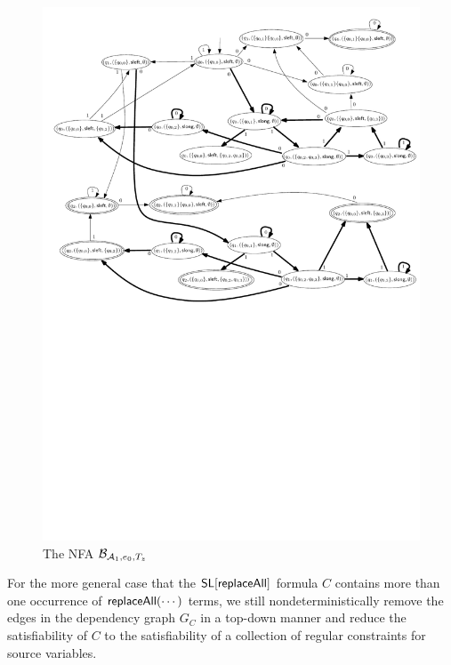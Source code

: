 \begin{example}
\begin{figure}[htbp]
\begin{center}
\includegraphics[scale=0.68]{regular-expression-example-2.pdf}
\end{center}
\caption{The NFA $\mathcal{B}_{\mathcal{A}_1, e_0, T_z}$}\label{fig-re-exmp}
\end{figure} 
\end{example}

For the more general case that the $\mathsf{SL}[\mathsf{replaceAll}]$ formula $C$ contains more than one occurrence of $\mathsf{replaceAll}(\cdots)$ terms, we still nondeterministically remove the edges in the dependency graph $G_C$ in a top-down manner and reduce the satisfiability of $C$ to the satisfiability of a collection of regular constraints for source variables. 

